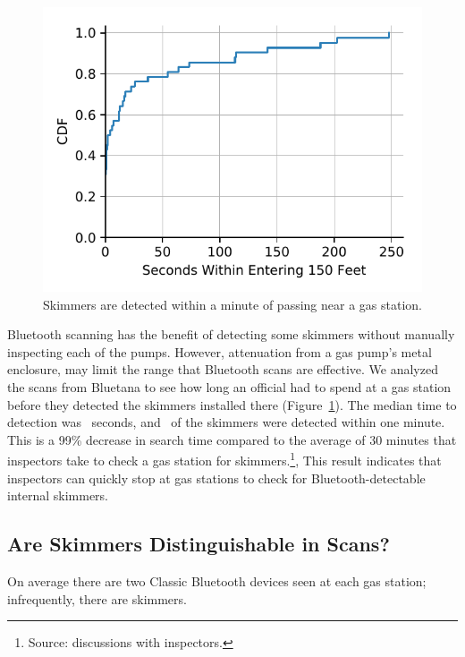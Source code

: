 \begin{figure}
\centering
\includegraphics[width=0.6\linewidth]{skimmer/plots/cdf_skim_discover_time.pdf}
\caption{
\label{fig:skim_discover_time}
 Skimmers are detected within a minute of passing near a gas station.
}
\end{figure}

Bluetooth scanning has the benefit of detecting some skimmers without manually inspecting each of the pumps.
%
However, attenuation from a gas pump's metal enclosure, may limit the range that Bluetooth scans are effective.
%
We analyzed the scans from Bluetana to see how long an official had to spend at a gas station before they detected the skimmers installed there (Figure~\ref{fig:skim_discover_time}).
%
%
The median time to detection was \skimmerdetectiontimemedian~seconds, and \skimmeroneminutepercent~of the skimmers were detected within one minute.
%
This is a 99\% decrease in search time compared to the average of 30 minutes
that inspectors take to check a gas station for skimmers.\footnote{Source:
discussions with inspectors.},
%
This result indicates that inspectors can quickly stop at gas stations to check for Bluetooth-detectable internal skimmers.

%
%



\subsection{Are Skimmers Distinguishable in Scans?} %
\label{sec:bluetooth:scans}

\begin{table}
    \centering
    \captionsetup{justification=centering}
    \caption{On average there are two Classic Bluetooth devices seen at each gas
    station; infrequently, there are skimmers.
    }
    

    \label{tab:data-overview}
\end{table}





